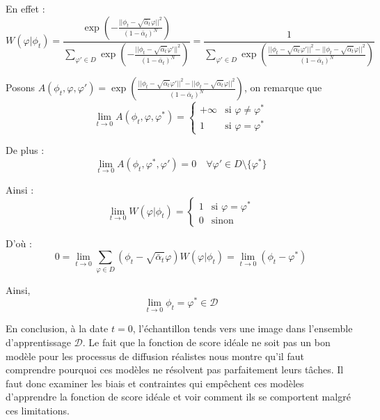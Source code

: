 \documentclass[a4paper,10pt]{article}
\theoremstyle{definition} %
\theoremstyle{definition} %
\theoremstyle{definition} %
\theoremstyle{definition} %
\begin{document}
En effet :
\begin{equation*}
    W(\varphi | \phi_t) =
\frac{\exp\left( -\frac{||\phi_t - \sqrt{\bar{\alpha}_t} \varphi||^2}{(1 - \bar{\alpha}_t)^N} \right)}
{\sum\limits_{\varphi' \in D} \exp\left( -\frac{||\phi_t - \sqrt{\bar{\alpha}_t} \varphi'||^2}{(1 - \bar{\alpha}_t)^N} \right)}
=\frac{1}{\sum\limits_{\varphi' \in D} \exp\left( \frac{||\phi_t - \sqrt{\bar{\alpha}_t} \varphi'||^2 - ||\phi_t - \sqrt{\bar{\alpha}_t} \varphi||^2}{(1 - \bar{\alpha}_t)^N} \right)}
\end{equation*}

Posons $A(\phi_t, \varphi, \varphi' ) = \exp\left( \frac{||\phi_t - \sqrt{\bar{\alpha}_t} \varphi'||^2 - ||\phi_t - \sqrt{\bar{\alpha}_t} \varphi||^2}{(1 - \bar{\alpha}_t)^N} \right)$, on remarque que
\begin{equation*}
    \lim\limits_{t \to 0} A(\phi_t, \varphi, \varphi^*) =
\begin{cases} 
+\infty & \text{si } \varphi \neq \varphi^* \\
1 & \text{si } \varphi = \varphi^*
\end{cases}
\end{equation*}

De plus :
\begin{equation*}
    \lim\limits_{t \to 0} A(\phi_t, \varphi^*, \varphi') = 0 \quad \forall \varphi' \in D \setminus \{\varphi^*\}
\end{equation*}

Ainsi :
\[
\lim\limits_{t \to 0} W(\varphi | \phi_t) =
\begin{cases} 
1 & \text{si } \varphi = \varphi^* \\
0 & \text{sinon}
\end{cases}
\]

D'où :
\[
0 = \lim\limits_{t \to 0} \sum\limits_{\varphi \in D} (\phi_t - \sqrt{\bar{\alpha}_t} \varphi) W(\varphi | \phi_t) = \lim\limits_{t \to 0} (\phi_t - \varphi^*)
\]

Ainsi,
\begin{equation*}
    \lim\limits_{t\rightarrow 0} \phi_t = \varphi^* \in \mathcal{D}
\end{equation*}

En conclusion, à la date $t = 0$, l'échantillon tends vers une image dans l'ensemble d'apprentissage $\mathcal{D}$. Le fait que la fonction de score idéale ne soit pas un bon modèle pour les processus de diffusion réalistes nous montre qu'il faut comprendre pourquoi ces modèles ne résolvent pas parfaitement leurs tâches. Il faut donc examiner les biais et contraintes qui empêchent ces modèles d'apprendre la fonction de score idéale et voir comment ils se comportent malgré ces limitations.
\end{document}
